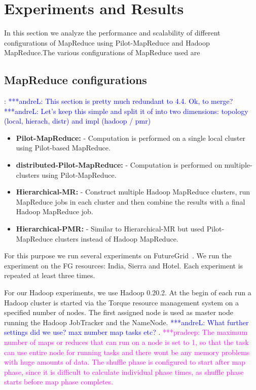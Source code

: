 \documentclass{acm_proc_article-sp}
\newcommand{\alnote}[1]{ {\textcolor{blue} { ***andreL: #1 }}}
\newcommand{\pnote}[1]{ {\textcolor{magenta} { ***pradeep: #1 }}}
\newcommand{\alnote}[1]{}
\newcommand{\pnote}[1]{}
\newcommand{\pilotmapreduce}{Pilot-MapReduce\xspace}
\begin{document}
\section{Experiments and Results}


In this section we analyze the performance and scalability of different configurations of MapReduce using 
\pilotmapreduce and  Hadoop MapReduce.The various configurations of MapReduce used are


\subsection{MapReduce configurations}:
\alnote{This section is pretty much redundant to 4.4. Ok, to merge?}
\alnote{Let's keep this simple and split it of into two dimensions: topology (local, hierach, distr) and impl (hadoop / pmr)}

\begin{itemize}
\item \textbf{\pilotmapreduce:}  - Computation is performed on a single local cluster using Pilot-based MapReduce.
\item \textbf{distributed-\pilotmapreduce:} - Computation is performed on multiple-clusters using \pilotmapreduce.
\item \textbf{Hierarchical-MR:} - Construct multiple Hadoop MapReduce clusters, run MapReduce jobs in each cluster and then combine the results with a final Hadoop MapReduce job. 
\item \textbf{Hierarchical-PMR:} - Similar to Hierarchical-MR but used \pilotmapreduce clusters instead of Hadoop MapReduce.
\end{itemize}

For this purpose we run several experiments
on FutureGrid~\cite{fg}. We run the experiment on the FG resources: India, 
Sierra and Hotel. Each experiment is repeated at least three times.

For our Hadoop experiments, we use Hadoop 0.20.2. At the begin of each run a 
Hadoop cluster is started via the Torque resource management system on a
specified number of nodes. The first assigned node is used as master node
running the Hadoop JobTracker and the NameNode. \alnote{What further settings
did we use? max number map tasks etc?}. \pnote{The maximum number of maps or 
reduces that can run on a node is set to 1, so that the task can use entire
node for running tasks and there wont be any memory problems with huge amounts
of data. The shuffle phase is configured to start after map phase, since it is
difficult to calculate individual phase times, as shuffle phase starts before
map phase completes.}
\end{document}
